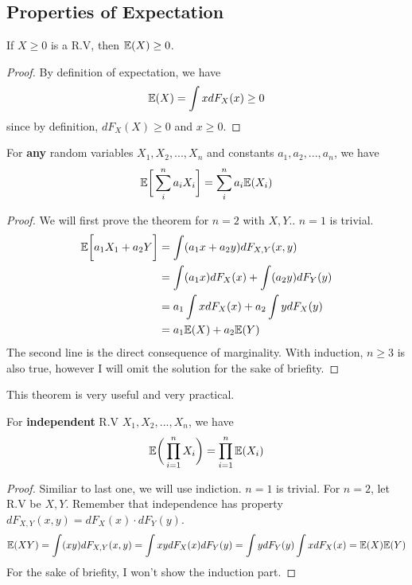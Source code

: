 \subsection*{Properties of Expectation}
\begin{theorem} If $X \ge 0$ is a R.V, then ${\mathbb{E}} (X) \ge 0$.
    \begin{proof}
        By definition of expectation, we have
        \[ {\mathbb{E}}(X) = \int x dF_X(x)  \ge 0 \]
        since by definition, $dF_X(X) \ge 0$ and $x \ge 0$.
    \end{proof}
\end{theorem}
\begin{theorem}[Linearity] For \textbf{any} random variables $X_1,X_2,...,X_n$ and constants $a_1,a_2,...,a_n$, we have 
    \[{\mathbb{E}} \bigg[ \sum^n_i a_iX_i \bigg] = \sum^n_i a_i{\mathbb{E}}({X_i})\]
    \begin{proof}
        We will first prove the theorem for $n=2$ with $X,Y$.. $n=1$ is trivial.
        \begin{align*}
            {\mathbb{E}} \bigg[ a_1X_1 + a_2Y\bigg] &= \int (a_1x+a_2y) dF_{X,Y}(x,y) \\
                                            &=\int (a_1x)dF_{X}(x) + \int (a_2y)dF_{Y}(y)\\
                                            &= a_1\int x dF_{X}(x) + a_2 \int y dF_{X}(y) \\
                                            &= a_1{\mathbb{E}}(X) + a_2{\mathbb{E}}(Y)
        \end{align*}
        The second line is the direct consequence of marginality.
        With induction, $n\ge 3$ is also true, however I will omit the solution for the sake of briefity.
    \end{proof}
    This theorem is very useful and very practical.
\end{theorem}
\begin{theorem}[multiplicity]
    For \textbf{independent} R.V $X_1,X_2,...,X_n$,  we have
    \[{\mathbb{E}} \bigg( \prod _{i=1}^nX_i \bigg) = \prod_{i=1}^n {\mathbb{E}}(X_i)\]
    \begin{proof}
        Similiar to last one, we will use indiction. $n=1$ is trivial. For $n=2$, let R.V be $X,Y$. Remember that independence has property $dF_{X,Y}(x,y)= dF_{X}(x)\cdot dF_{Y}(y)$.
        \[{\mathbb{E}}(XY) = \int (xy)dF_{X,Y}(x,y) = \int xydF_{X}(x)dF_{Y}(y)= \int ydF_Y(y)\int xdF_X(x)= {\mathbb{E}}(X){\mathbb{E}}(Y)\]
        For the sake of briefity, I won't show the induction part.
    \end{proof}
\end{theorem}
